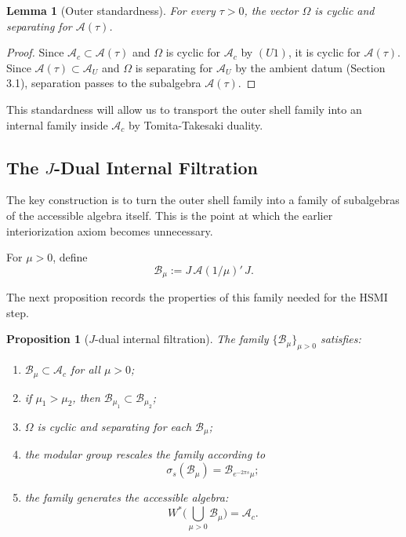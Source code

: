 \documentclass[12pt]{article}
\newtheorem{proposition}[theorem]{Proposition}
\newtheorem{lemma}[theorem]{Lemma}
\theoremstyle{definition}
\theoremstyle{remark}
\newcommand{\tightlist}{%
  \setlength{\itemsep}{0pt}\setlength{\parskip}{0pt}}
\begin{document}
\begin{lemma}[Outer standardness]\label{lem:4.2}
For every \(\tau>0\), the vector \(\Omega\) is cyclic and separating for
\(\mathcal{A}(\tau)\).
\end{lemma}

\begin{proof}
Since \(\mathcal{A}_c\subset \mathcal{A}(\tau)\) and
\(\Omega\) is cyclic for \(\mathcal{A}_c\) by \((U1)\), it is cyclic for
\(\mathcal{A}(\tau)\). Since \(\mathcal{A}(\tau)\subset \mathcal{A}_U\)
and \(\Omega\) is separating for \(\mathcal{A}_U\) by the ambient datum
(Section 3.1), separation passes to the subalgebra
\(\mathcal{A}(\tau)\).
\end{proof}

This standardness will allow us to transport the outer shell family into
an internal family inside \(\mathcal{A}_c\) by Tomita-Takesaki duality.

\subsection{\texorpdfstring{The \(J\)-Dual Internal
Filtration}{The J-Dual Internal Filtration}}\label{the-j-dual-internal-filtration}

The key construction is to turn the outer shell family into a family of
subalgebras of the accessible algebra itself. This is the point at which
the earlier interiorization axiom becomes unnecessary.

For \(\mu>0\), define \[
\mathcal{B}_\mu:=J\,\mathcal{A}(1/\mu)'\,J.
\]

The next proposition records the properties of this family needed for
the HSMI step.

\begin{proposition}[\(J\)-dual internal filtration]\label{prop:4.3}
The family \(\{\mathcal{B}_\mu\}_{\mu>0}\) satisfies:

\begin{enumerate}
\def\labelenumi{\arabic{enumi}.}
\tightlist
\item
  \(\mathcal{B}_\mu\subset \mathcal{A}_c\) for all \(\mu>0\);
\item
  if \(\mu_1>\mu_2\), then
  \(\mathcal{B}_{\mu_1}\subset \mathcal{B}_{\mu_2}\);
\item
  \(\Omega\) is cyclic and separating for each \(\mathcal{B}_\mu\);
\item
  the modular group rescales the family according to \[
  \sigma_s(\mathcal{B}_\mu)=\mathcal{B}_{e^{-2\pi s}\mu};
  \]
\item
  the family generates the accessible algebra: \[
  W^*\!\Big(\bigcup_{\mu>0}\mathcal{B}_\mu\Big)=\mathcal{A}_c.
  \]
\end{enumerate}
\end{proposition}
\end{document}
